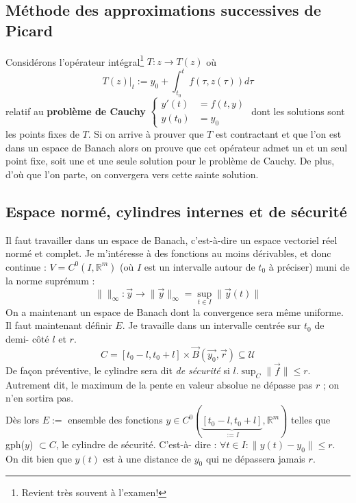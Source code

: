 \subsection{Méthode des approximations successives de Picard}
Considérons l'opérateur intégral\footnote{Revient très souvent à l'examen!} $T : 
z\rightarrow T(z)$ où 
\begin{equation}
	T(z)|_t := y_0 + \int_{t_0}^t f(\tau,z(\tau))d\tau
\end{equation}
relatif au \textbf{problème de Cauchy} $\left\{\begin{array}{ll}
y'(t) &= f(t,y)\\
y(t_0) &= y_0
\end{array}\right.$ dont les solutions sont les points fixes de $T$. Si on arrive 
à prouver que $T$ est contractant et que l'on est dans un espace de Banach alors 
on prouve que cet opérateur admet un et un seul point fixe, soit une et une seule 
solution pour le problème de Cauchy. De plus, d'où que l'on parte, on convergera 
vers cette sainte solution.
	
\subsection{Espace normé, cylindres internes et de sécurité}
Il faut travailler dans un espace de Banach, c'est-à-dire un espace vectoriel 
réel normé et complet. Je m'intéresse à des fonctions au moins dérivables, et 
donc continue : $V = C^0(I,\mathbb{R}^m)$ (où $I$ est un intervalle autour de $t_0$ 
à préciser) muni de la norme suprémum :
\begin{equation}
	\| \|_\infty : \vec{y} \rightarrow \|\vec{y}\|_\infty = \sup_{t\in I}\|\vec{y}(t)
	\|
\end{equation}
On a maintenant un espace de Banach dont la convergence sera même uniforme. Il faut 
maintenant définir $E$. Je travaille dans un intervalle centrée sur $t_0$ de demi-
côté $l$ et $r$. 
\begin{equation}
	C = [t_0-l, t_0+l]\times\vec{B}(\vec{y_0},\vec{r}) \subseteq \mathcal{U}
\end{equation}
De façon préventive, le cylindre sera dit \textit{de sécurité} si $l.\sup_C \|\vec{f}
\| \leq r$. Autrement dit, le maximum de la pente en valeur absolue ne dépasse pas 
$r$ ; on n'en sortira pas.\\
	
Dès lors $E :=$ ensemble des fonctions $y\in C^0(\underbrace{[t_0-l,t_0+l]}_{:= I}, 
\mathbb{R}^m)$ telles que gph($y$) $\subset C$, le cylindre de sécurité. C'est-à-
dire : $\forall t \in I : \| y(t) - y_0\| \leq r$. On dit bien que $y(t)$ est à une 
distance de $y_0$ qui ne dépassera jamais $r$.
	
